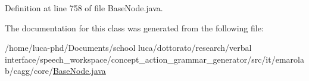 Definition at line 758 of file Base\-Node.\-java.



The documentation for this class was generated from the following file\-:\begin{DoxyCompactItemize}
\item 
/home/luca-\/phd/\-Documents/school luca/dottorato/research/verbal interface/speech\-\_\-workspace/concept\-\_\-action\-\_\-grammar\-\_\-generator/src/it/emarolab/cagg/core/\hyperlink{BaseNode_8java}{Base\-Node.\-java}\end{DoxyCompactItemize}
